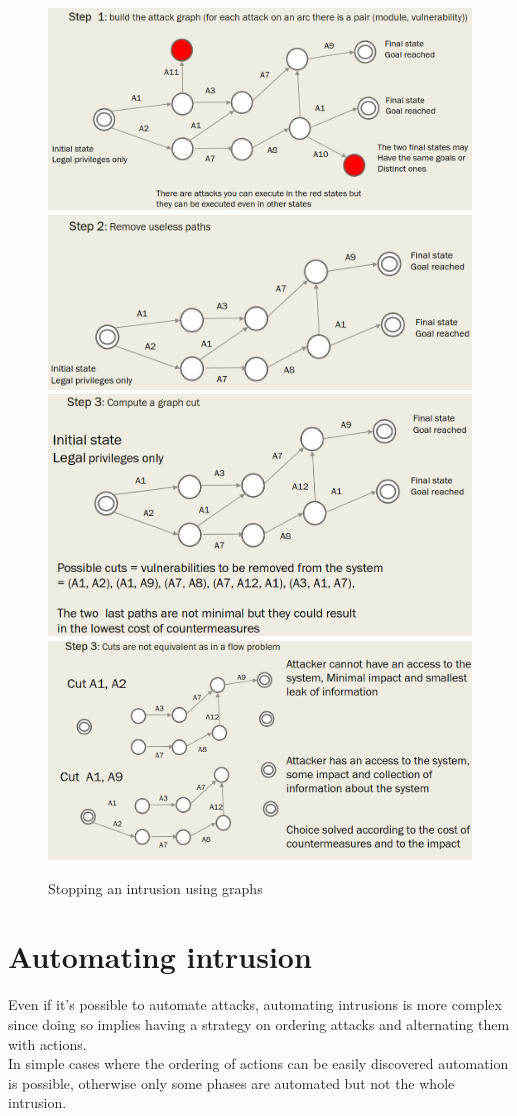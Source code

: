 \begin{figure}[htbp]
   \centering
   \includegraphics[width=0.48\columnwidth]{images/stop_intrusions_step1.png}
   \includegraphics[width=0.48\columnwidth]{images/stop_intrusions_step2.png}\\
   \includegraphics[width=0.48\columnwidth]{images/stop_intrusions_step3.png}
   \includegraphics[width=0.48\columnwidth]{images/stop_intrusions_step4.png}
   \caption{Stopping an intrusion using graphs}
   \label{fig:stop_intrusions_steps}
\end{figure}

\section{Automating intrusion}
Even if it's possible to automate attacks, automating intrusions is more complex since
doing so implies having a strategy on ordering attacks and alternating them with actions.\\
In simple cases where the ordering of actions can be easily
discovered automation is possible,
otherwise 
only some phases are automated but not the whole intrusion.

